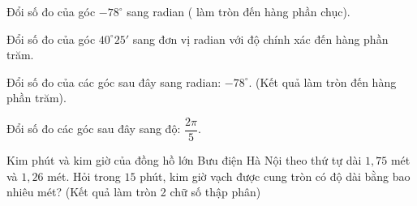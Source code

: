 \begin{ex}%
	Đổi số đo  của góc $-78 ^{\circ}$ sang radian ( làm tròn đến hàng phần chục).
	\loigiai{ 
		\[-78 ^{\circ}=\dfrac{-78^\circ\pi}{180^\circ}=\dfrac{-13\pi}{30} \approx -1{,}4 \text{  rad}.
		\] 
	} 
\end{ex}

\begin{ex}%
	Đổi số đo của góc $40^{\circ} 25'$ sang đơn vị radian với độ chính  xác đến hàng phần trăm.
\end{ex}

\begin{ex}%
	Đổi  số đo của các góc sau đây sang radian: $-78^{\circ}$. (Kết quả làm tròn đến hàng phần trăm).
\end{ex}

\begin{ex}%
	Đổi  số đo các góc sau đây sang độ: $\dfrac{2\pi}{5}$.
\end{ex}

\begin{ex}%
	Kim phút và kim giờ của đồng hồ lớn Bưu điện Hà Nội theo thứ tự dài $1{,}75$ mét và $1{,}26$ mét. Hỏi trong  $15$ phút, kim giờ vạch được cung tròn có độ dài bằng bao nhiêu mét? (Kết quả làm tròn 2 chữ số thập phân)
\end{ex}

